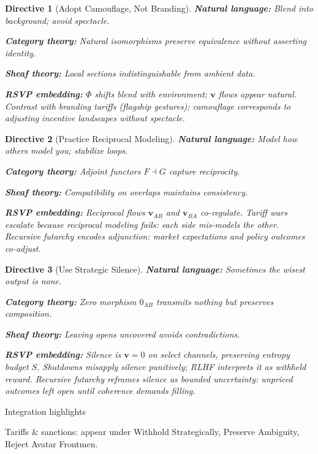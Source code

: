 \documentclass{article}
\newtheorem{directive}{Directive}
\begin{document}
\begin{directive}[Adopt Camouflage, Not Branding]
\textbf{Natural language:} Blend into background; avoid spectacle.  

\textbf{Category theory:} Natural isomorphisms preserve equivalence without asserting identity.  

\textbf{Sheaf theory:} Local sections indistinguishable from ambient data.  

\textbf{RSVP embedding:} $\Phi$ shifts blend with environment; $\mathbf{v}$ flows appear natural.  
Contrast with branding tariffs (flagship gestures); camouflage corresponds to adjusting incentive landscapes without spectacle.
\end{directive}

\begin{directive}[Practice Reciprocal Modeling]
\textbf{Natural language:} Model how others model you; stabilize loops.  

\textbf{Category theory:} Adjoint functors $F \dashv G$ capture reciprocity.  

\textbf{Sheaf theory:} Compatibility on overlaps maintains consistency.  

\textbf{RSVP embedding:} Reciprocal flows $\mathbf{v}_{AB}$ and $\mathbf{v}_{BA}$ co-regulate.  
Tariff wars escalate because reciprocal modeling fails: each side mis-models the other.  
Recursive futarchy encodes adjunction: market expectations and policy outcomes co-adjust.
\end{directive}

\begin{directive}[Use Strategic Silence]
\textbf{Natural language:} Sometimes the wisest output is none.  

\textbf{Category theory:} Zero morphism $0_{AB}$ transmits nothing but preserves composition.  

\textbf{Sheaf theory:} Leaving opens uncovered avoids contradictions.  

\textbf{RSVP embedding:} Silence is $\mathbf{v}=0$ on select channels, preserving entropy budget $S$.  
Shutdowns misapply silence punitively; RLHF interprets it as withheld reward.  
Recursive futarchy reframes silence as bounded uncertainty: unpriced outcomes left open until coherence demands filling.
\end{directive}

Integration highlights

Tariffs \& sanctions: appear under Withhold Strategically, Preserve Ambiguity, Reject Avatar Frontmen.
\end{document}

